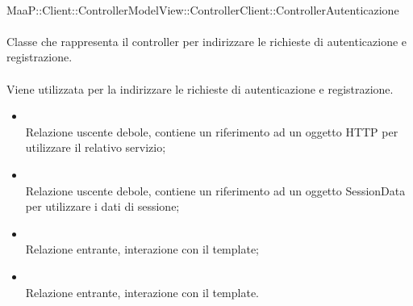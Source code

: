 	\\
	MaaP::Client::ControllerModelView::ControllerClient::ControllerAutenticazione\\
	\\
	Classe che rappresenta il controller per indirizzare le richieste di autenticazione e registrazione.\\
	\\
	Viene utilizzata per la indirizzare le richieste di autenticazione e registrazione.\\
	\begin{itemize}
	\item{}\\
	Relazione uscente debole, contiene un riferimento ad un oggetto HTTP per utilizzare il relativo servizio;
	\item{}\\
	Relazione uscente debole, contiene un riferimento ad un oggetto SessionData per utilizzare i dati di sessione;
	\item{}\\
	Relazione entrante, interazione con il template;
	\item{}\\
	Relazione entrante, interazione con il template.
	\end{itemize}
	

